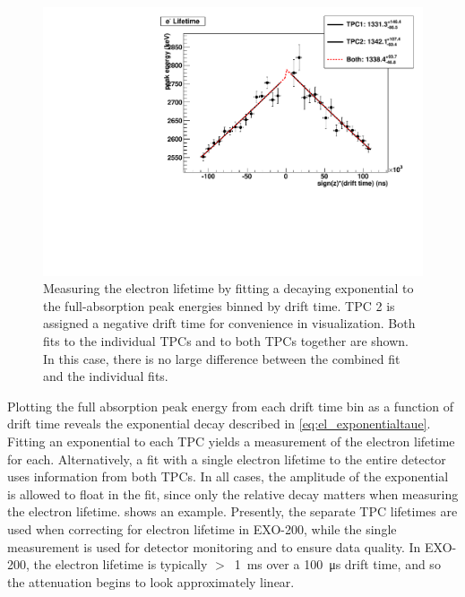 \documentclass[herrin-thesis.tex]{subfiles}
\begin{document}
\begin{figure}[tbp]
\centering
\includegraphics[width=0.6\columnwidth]{./plots/el_run4228_fit.pdf}
\caption[A fit to the exponential attenuation of the full-absorption peak]{Measuring the electron lifetime by fitting a decaying exponential to the full-absorption peak energies binned by drift time. TPC 2 is assigned a negative drift time for convenience in visualization. Both fits to the individual TPCs and to both TPCs together are shown. In this case, there is no large difference between the combined fit and the individual fits.}
\label{fig:el_elfit}
\end{figure}

Plotting the full absorption peak energy from each drift time bin as a function of drift time reveals the exponential decay described in \cref{eq:el_exponentialtaue}. Fitting an exponential to each TPC yields a measurement of the electron lifetime for each. Alternatively, a fit with a single electron lifetime to the entire detector uses information from both TPCs. In all cases, the amplitude of the exponential is allowed to float in the fit, since only the relative decay matters when measuring the electron lifetime.  shows an example. Presently, the separate TPC lifetimes are used when correcting for electron lifetime in EXO-200, while the single measurement is used for detector monitoring and to ensure data quality. In EXO-200, the electron lifetime is typically \(>\)~\SI{1}{\ms} over a \SI{100}{\micro\s} drift time, and so the attenuation begins to look approximately linear.
\end{document}
